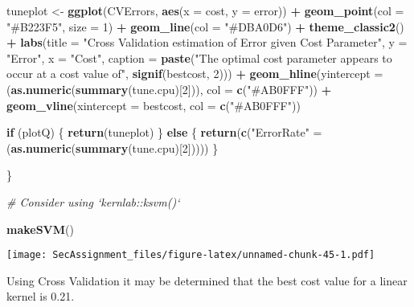 \documentclass[12pt]{article}
\newenvironment{Shaded}{\begin{snugshade}}{\end{snugshade}}
\newcommand{\CommentTok}[1]{\textcolor[rgb]{0.56,0.35,0.01}{\textit{#1}}}
\newcommand{\ControlFlowTok}[1]{\textcolor[rgb]{0.13,0.29,0.53}{\textbf{#1}}}
\newcommand{\DataTypeTok}[1]{\textcolor[rgb]{0.13,0.29,0.53}{#1}}
\newcommand{\DecValTok}[1]{\textcolor[rgb]{0.00,0.00,0.81}{#1}}
\newcommand{\KeywordTok}[1]{\textcolor[rgb]{0.13,0.29,0.53}{\textbf{#1}}}
\newcommand{\NormalTok}[1]{#1}
\newcommand{\OperatorTok}[1]{\textcolor[rgb]{0.81,0.36,0.00}{\textbf{#1}}}
\newcommand{\StringTok}[1]{\textcolor[rgb]{0.31,0.60,0.02}{#1}}
\begin{document}
\begin{Shaded}
\begin{Highlighting}[]
\NormalTok{tuneplot <-}\StringTok{ }\KeywordTok{ggplot}\NormalTok{(CVErrors, }\KeywordTok{aes}\NormalTok{(}\DataTypeTok{x =}\NormalTok{ cost, }\DataTypeTok{y =}\NormalTok{ error)) }\OperatorTok{+}
\StringTok{  }\KeywordTok{geom_point}\NormalTok{(}\DataTypeTok{col =} \StringTok{"#B223F5"}\NormalTok{, }\DataTypeTok{size =} \DecValTok{1}\NormalTok{) }\OperatorTok{+}
\StringTok{  }\KeywordTok{geom_line}\NormalTok{(}\DataTypeTok{col =} \StringTok{"#DBA0D6"}\NormalTok{) }\OperatorTok{+}
\StringTok{  }\KeywordTok{theme_classic2}\NormalTok{() }\OperatorTok{+}
\StringTok{  }\KeywordTok{labs}\NormalTok{(}\DataTypeTok{title =} \StringTok{"Cross Validation estimation of Error given Cost Parameter"}\NormalTok{, }\DataTypeTok{y =} \StringTok{"Error"}\NormalTok{, }\DataTypeTok{x =} \StringTok{"Cost"}\NormalTok{, }\DataTypeTok{caption =} \KeywordTok{paste}\NormalTok{(}\StringTok{"The optimal cost parameter appears to occur at a cost value of"}\NormalTok{, }\KeywordTok{signif}\NormalTok{(bestcost, }\DecValTok{2}\NormalTok{))) }\OperatorTok{+}
\StringTok{  }\KeywordTok{geom_hline}\NormalTok{(}\DataTypeTok{yintercept =}\NormalTok{ (}\KeywordTok{as.numeric}\NormalTok{(}\KeywordTok{summary}\NormalTok{(tune.cpu)[}\DecValTok{2}\NormalTok{])), }\DataTypeTok{col =} \KeywordTok{c}\NormalTok{(}\StringTok{"#AB0FFF"}\NormalTok{)) }\OperatorTok{+}\StringTok{ }
\StringTok{  }\KeywordTok{geom_vline}\NormalTok{(}\DataTypeTok{xintercept =}\NormalTok{ bestcost, }\DataTypeTok{col =} \KeywordTok{c}\NormalTok{(}\StringTok{"#AB0FFF"}\NormalTok{))}



\ControlFlowTok{if}\NormalTok{ (plotQ) \{}
 \KeywordTok{return}\NormalTok{(tuneplot) }
\NormalTok{\} }\ControlFlowTok{else}\NormalTok{ \{}
  \KeywordTok{return}\NormalTok{(}\KeywordTok{c}\NormalTok{(}\StringTok{"ErrorRate"}\NormalTok{ =}\StringTok{ }\NormalTok{(}\KeywordTok{as.numeric}\NormalTok{(}\KeywordTok{summary}\NormalTok{(tune.cpu)[}\DecValTok{2}\NormalTok{]))))}
\NormalTok{\}}


\NormalTok{\}}

\CommentTok{# Consider using `kernlab::ksvm()`}

\KeywordTok{makeSVM}\NormalTok{()}
\end{Highlighting}
\end{Shaded}

\texttt{[image: SecAssignment\_files/figure-latex/unnamed-chunk-45-1.pdf]}

Using Cross Validation it may be determined that the best cost value for
a linear kernel is 0.21.
\end{document}
